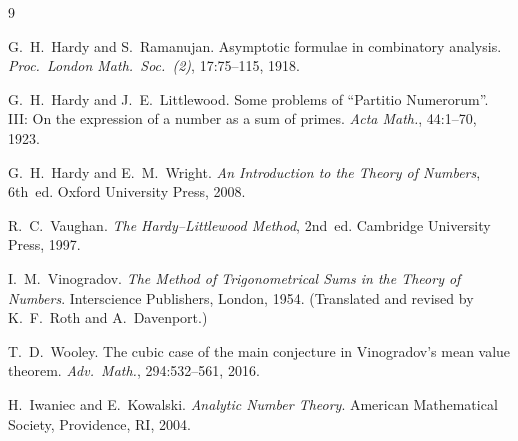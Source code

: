 \documentclass[12pt,a4paper]{amsart}
\theoremstyle{definition}
\begin{document}
\begin{thebibliography}{9}

G.~H.~Hardy and S.~Ramanujan.
\newblock Asymptotic formulae in combinatory analysis.
\newblock \emph{Proc.\ London Math.\ Soc.\ (2)}, 17:75--115, 1918.

G.~H.~Hardy and J.~E.~Littlewood.
\newblock Some problems of ``Partitio Numerorum''.  III: On the expression of
  a number as a sum of primes.
\newblock \emph{Acta Math.}, 44:1--70, 1923.

G.~H.~Hardy and E.~M.~Wright.
\newblock \emph{An Introduction to the Theory of Numbers}, 6th~ed.
\newblock Oxford University Press, 2008.

R.~C.~Vaughan.
\newblock \emph{The Hardy--Littlewood Method}, 2nd~ed.
\newblock Cambridge University Press, 1997.

I.~M.~Vinogradov.
\newblock \emph{The Method of Trigonometrical Sums in the Theory of Numbers}.
\newblock Interscience Publishers, London, 1954.
  (Translated and revised by K.~F.~Roth and A.~Davenport.)

T.~D.~Wooley.
\newblock The cubic case of the main conjecture in Vinogradov's mean value theorem.
\newblock \emph{Adv.\ Math.}, 294:532--561, 2016.

H.~Iwaniec and E.~Kowalski.
\newblock \emph{Analytic Number Theory}.
\newblock American Mathematical Society, Providence, RI, 2004.

\end{thebibliography}
\end{document}
